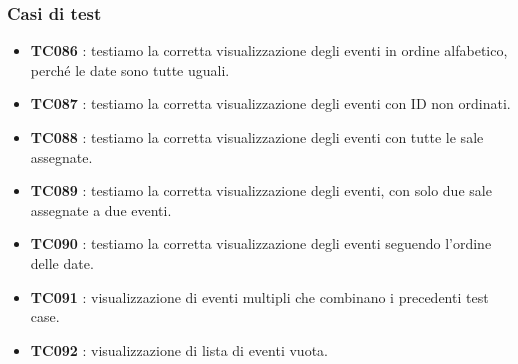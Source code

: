 \documentclass[11pt]{scrartcl} %
\begin{document}
\subsubsection{Casi di test}

\begin{itemize}


	\item \textbf{TC086} : testiamo la corretta visualizzazione degli eventi in ordine alfabetico, perché le date sono tutte uguali.

	\item \textbf{TC087} : testiamo la corretta visualizzazione degli eventi con ID non ordinati.

	\item \textbf{TC088} : testiamo la corretta visualizzazione degli eventi con tutte le sale assegnate.

	\item \textbf{TC089} : testiamo la corretta visualizzazione degli eventi, con solo due sale assegnate a due eventi.

	\item \textbf{TC090} : testiamo la corretta visualizzazione degli eventi seguendo l'ordine delle date.

	\item \textbf{TC091} : visualizzazione di eventi multipli che combinano i precedenti test case.

	\item \textbf{TC092} : visualizzazione di lista di eventi vuota.
\end{itemize}
\end{document}
